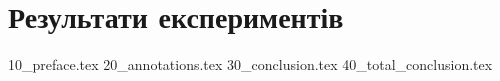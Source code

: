 \chapter{Результати експериментів}
{10_preface.tex}
{20_annotations.tex}
{30_conclusion.tex}
{40_total_conclusion.tex}
